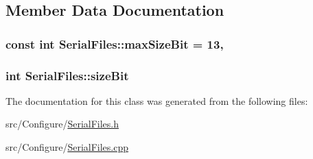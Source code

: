 \subsection{Member Data Documentation}
\hypertarget{class_serial_files_a748a5387dda9cfe1150ff5d189e64eb0}{
\subsubsection[{max\+Size\+Bit}]{\setlength{\rightskip}{0pt plus 5cm}const int Serial\+Files\+::max\+Size\+Bit = 13\hspace{0.3cm}{\ttfamily [static]}, {\ttfamily [private]}}}\label{class_serial_files_a748a5387dda9cfe1150ff5d189e64eb0}
\hypertarget{class_serial_files_acabed1bad4c479b8ce9e99749a540493}{
\subsubsection[{size\+Bit}]{\setlength{\rightskip}{0pt plus 5cm}int Serial\+Files\+::size\+Bit\hspace{0.3cm}{\ttfamily [private]}}}\label{class_serial_files_acabed1bad4c479b8ce9e99749a540493}


The documentation for this class was generated from the following files\+:\begin{DoxyCompactItemize}
\item 
src/\+Configure/\hyperlink{_serial_files_8h}{Serial\+Files.\+h}\item 
src/\+Configure/\hyperlink{_serial_files_8cpp}{Serial\+Files.\+cpp}\end{DoxyCompactItemize}
